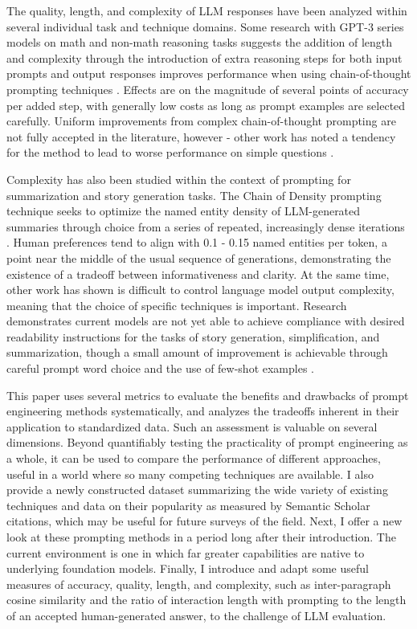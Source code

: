 \documentclass[11pt]{article}
\begin{document}
The quality, length, and complexity of LLM responses have been analyzed within several individual task and technique domains. Some research with GPT-3 series models on math and non-math reasoning tasks suggests the addition of length and complexity through the introduction of extra reasoning steps for both input prompts and output responses improves performance when using chain-of-thought prompting techniques \cite{fu_complexity-based_2023}. Effects are on the magnitude of several points of accuracy per added step, with generally low costs as long as prompt examples are selected carefully. Uniform improvements from complex chain-of-thought prompting are not fully accepted in the literature, however - other work has noted a tendency for the method to lead to worse performance on simple questions \cite{shum_automatic_2023}.

Complexity has also been studied within the context of prompting for summarization and story generation tasks. The Chain of Density prompting technique seeks to optimize the named entity density of LLM-generated summaries through choice from a series of repeated, increasingly dense iterations \cite{adams_sparse_2023}. Human preferences tend to align with 0.1 - 0.15 named entities per token, a point near the middle of the usual sequence of generations, demonstrating the existence of a tradeoff between informativeness and clarity. At the same time, other work has shown is difficult to control language model output complexity, meaning that the choice of specific techniques is important. Research demonstrates current models are not yet able to achieve compliance with desired readability instructions for the tasks of story generation, simplification, and summarization, though a small amount of improvement is achievable through careful prompt word choice and the use of few-shot examples \cite{pu_chatgpt_2023, imperial_flesch_2023}.

This paper uses several metrics to evaluate the benefits and drawbacks of prompt engineering methods systematically, and analyzes the tradeoffs inherent in their application to standardized data. Such an assessment is valuable on several dimensions. Beyond quantifiably testing the practicality of prompt engineering as a whole, it can be used to compare the performance of different approaches, useful in a world where so many competing techniques are available. I also provide a newly constructed dataset summarizing the wide variety of existing techniques and data on their popularity as measured by Semantic Scholar citations, which may be useful for future surveys of the field. Next, I offer a new look at these prompting methods in a period long after their introduction. The current environment is one in which far greater capabilities are native to underlying foundation models. Finally, I introduce and adapt some useful measures of accuracy, quality, length, and complexity, such as inter-paragraph cosine similarity and the ratio of interaction length with prompting to the length of an accepted human-generated answer, to the challenge of LLM evaluation.
\end{document}
